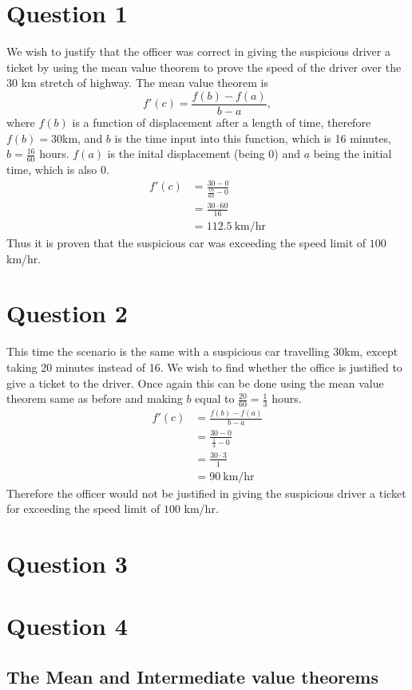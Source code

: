 \documentclass{article}
\begin{document}
\titleGP
\section*{Question 1}
We wish to justify that the officer was correct in giving the suspicious driver a ticket by using the mean value theorem to prove the speed of the driver over the 30 km stretch of highway. The mean value theorem is
$$f'(c) = \frac{f(b)-f(a)}{b-a},$$
where $f(b)$ is a function of displacement after a length of time, therefore $f(b) = 30$km, and $b$ is the time input into this function, which is 16 minutes, $b=\frac{16}{60}$ hours. $f(a)$ is the inital displacement (being $0$) and $a$ being the initial time, which is also $0$. 
\begin{align*}
f'(c) &= \frac{30-0}{\frac{16}{60}-0}\\
&= \frac{30 \cdot 60}{16}\\
&= 112.5\ \mbox{km/hr}
\end{align*}
Thus it is proven that the suspicious car was exceeding the speed limit of $100$ km/hr. 

\section*{Question 2}
This time the scenario is the same with a suspicious car travelling 30km, except taking 20 minutes instead of 16. We wish to find whether the office is justified to give a ticket to the driver. Once again this can be done using the mean value theorem same as before and making $b$ equal to $\frac{20}{60} = \frac{1}{3}$ hours.
\begin{align*}
f'(c) &= \frac{f(b)-f(a)}{b-a}\\
&= \frac{30-0}{\frac{1}{3}-0}\\
&= \frac{30 \cdot 3}{1}\\
&= 90 \ \mbox{km/hr}
\end{align*}
Therefore the officer would not be justified in giving the suspicious driver a ticket for exceeding the speed limit of $100$ km/hr.

\section*{Question 3}

\section*{Question 4}
\subsection*{The Mean and Intermediate value theorems}
\end{document}
